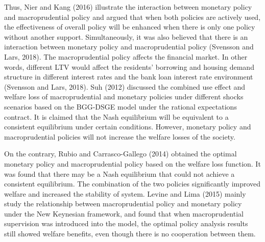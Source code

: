 \documentclass[final,3p,times,twocolumn]{elsarticle}
\begin{document}
Thus, Nier and Kang (2016) illustrate the interaction between monetary policy and macroprudential policy and argued that when both policies are actively used, the effectiveness of overall policy will be enhanced when there is only one policy without another support. Simultaneously, it was also believed that there is an interaction between monetary policy and macroprudential policy (Svensson and Lars, 2018). The macroprudential policy affects the financial market. In other words, different LTV would affect the residents' borrowing and housing demand structure in different interest rates and the bank loan interest rate environment (Svensson and Lars, 2018). Suh (2012) discussed the combined use effect and welfare loss of macroprudential and monetary policies under different shocks scenarios based on the BGG-DSGE model under the rational expectations contract. It is claimed that the Nash equilibrium will be equivalent to a consistent equilibrium under certain conditions. However, monetary policy and macroprudential policies will not increase the welfare losses of the society.\par

On the contrary, Rubio and Carrasco-Gallego (2014) obtained the optimal monetary policy and macroprudential policy based on the welfare loss function. It was found that there may be a Nash equilibrium that could not achieve a consistent equilibrium. The combination of the two policies significantly improved welfare and increased the stability of system. Levine and Lima (2015) mainly study the relationship between macroprudential policy and monetary policy under the New Keynesian framework, and found that when macroprudential supervision was introduced into the model, the optimal policy analysis results still showed welfare benefits, even though there is no cooperation between them.\par
\end{document}
